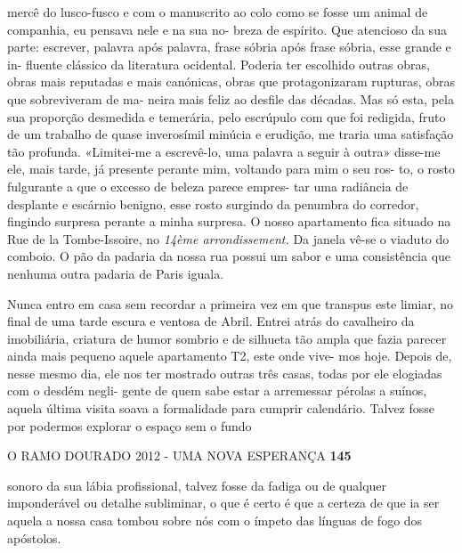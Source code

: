 mercê do lusco-fusco e com o manuscrito ao colo como se fosse um animal
de companhia, eu pensava nele e na sua no- breza de espírito. Que
atencioso da sua parte: escrever, palavra após palavra, frase sóbria
após frase sóbria, esse grande e in- fluente clássico da literatura
ocidental. Poderia ter escolhido outras obras, obras mais reputadas e
mais canónicas, obras que protagonizaram rupturas, obras que
sobreviveram de ma- neira mais feliz ao desfile das décadas. Mas só
esta, pela sua proporção desmedida e temerária, pelo escrúpulo com que
foi redigida, fruto de um trabalho de quase inverosímil minúcia e
erudição, me traria uma satisfação tão profunda. «Limitei-me a
escrevê-lo, uma palavra a seguir à outra» disse-me ele, mais tarde, já
presente perante mim, voltando para mim o seu ros- to, o rosto
fulgurante a que o excesso de beleza parece empres- tar uma radiância de
desplante e escárnio benigno, esse rosto surgindo da penumbra do
corredor, fingindo surpresa perante a minha surpresa. O nosso
apartamento fica situado na Rue de la Tombe-Issoire, no \emph{14ème
arrondissement. }Da janela vê-se o viaduto do comboio. O pão da padaria
da nossa rua possui um sabor e uma consistência que nenhuma outra
padaria de Paris iguala.

Nunca entro em casa sem recordar a primeira vez em que transpus este
limiar, no final de uma tarde escura e ventosa de Abril. Entrei atrás do
cavalheiro da imobiliária, criatura de humor sombrio e de silhueta tão
ampla que fazia parecer ainda mais pequeno aquele apartamento T2, este
onde vive- mos hoje. Depois de, nesse mesmo dia, ele nos ter mostrado
outras três casas, todas por ele elogiadas com o desdém negli- gente de
quem sabe estar a arremessar pérolas a suínos, aquela última visita
soava a formalidade para cumprir calendário. Talvez fosse por podermos
explorar o espaço sem o fundo

O RAMO DOURADO 2012 - UMA NOVA ESPERANÇA \textbf{145}

sonoro da sua lábia profissional, talvez fosse da fadiga ou de qualquer
imponderável ou detalhe subliminar, o que é certo é que a certeza de que
ia ser aquela a nossa casa tombou sobre nós com o ímpeto das línguas de
fogo dos apóstolos.

